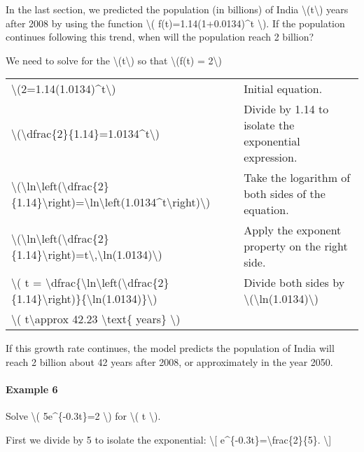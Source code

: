 In the last section, we predicted the population (in billions) of India
\textbackslash{}(t\textbackslash{}) years after 2008 by using the
function \textbackslash{}( f(t)=1.14(1+0.0134)\^{}t \textbackslash{}).
If the population continues following this trend, when will the
population reach 2 billion?

We need to solve for the \textbackslash{}(t\textbackslash{}) so that
\textbackslash{}(f(t) = 2\textbackslash{})

\begin{longtable}[]{@{}ll@{}}
\toprule
\endhead
\textbackslash{}(2=1.14(1.0134)\^{}t\textbackslash{}) & Initial
equation.\tabularnewline
\textbackslash{}(\textbackslash{}dfrac\{2\}\{1.14\}=1.0134\^{}t\textbackslash{})
& Divide by 1.14 to isolate the exponential expression.\tabularnewline
\textbackslash{}(\textbackslash{}ln\textbackslash{}left(\textbackslash{}dfrac\{2\}\{1.14\}\textbackslash{}right)=\textbackslash{}ln\textbackslash{}left(1.0134\^{}t\textbackslash{}right)\textbackslash{})
& Take the logarithm of both sides of the equation.\tabularnewline
\textbackslash{}(\textbackslash{}ln\textbackslash{}left(\textbackslash{}dfrac\{2\}\{1.14\}\textbackslash{}right)=t\textbackslash{},\textbackslash{}ln(1.0134)\textbackslash{})
& Apply the exponent property on the right side.\tabularnewline
\textbackslash{}( t =
\textbackslash{}dfrac\{\textbackslash{}ln\textbackslash{}left(\textbackslash{}dfrac\{2\}\{1.14\}\textbackslash{}right)\}\{\textbackslash{}ln(1.0134)\}\textbackslash{})
& Divide both sides by
\textbackslash{}(\textbackslash{}ln(1.0134)\textbackslash{})\tabularnewline
\textbackslash{}( t\textbackslash{}approx 42.23 \textbackslash{}text\{
years\} \textbackslash{}) &\tabularnewline
\bottomrule
\end{longtable}

If this growth rate continues, the model predicts the population of
India will reach 2 billion about 42 years after 2008, or approximately
in the year 2050.

\hypertarget{example-6}{%
\paragraph{Example 6}\label{example-6}}

Solve \textbackslash{}( 5e\^{}\{-0.3t\}=2 \textbackslash{}) for
\textbackslash{}( t \textbackslash{}).

First we divide by 5 to isolate the exponential: \textbackslash{}{[}
e\^{}\{-0.3t\}=\textbackslash{}frac\{2\}\{5\}. \textbackslash{}{]}

